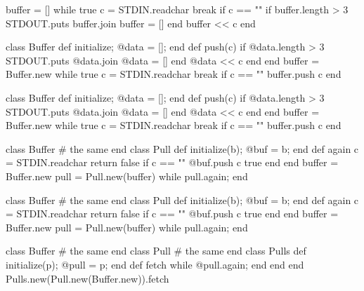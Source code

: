 \documentclass{article}
\begin{document}
\begin{pptWide}{2}
{\scriptsize\begin{ffcode}
buffer = []
while true
  c = STDIN.readchar
  break if c == "\n"
  if buffer.length > 3
    STDOUT.puts buffer.join
    buffer = []
  end
  buffer << c
end
\end{ffcode}
}
\par\columnbreak\par
{\scriptsize\begin{ffcode}
class Buffer
  def initialize; @data = []; end
  def push(c)
    if @data.length > 3
      STDOUT.puts @data.join
      @data = []
    end
    @data << c
  end
end
buffer = Buffer.new
while true
  c = STDIN.readchar
  break if c == "\n"
  buffer.push c
end
\end{ffcode}
}
\end{pptWide}
\plush{}

\begin{pptWide}{2}
{\scriptsize\begin{ffcode}
class Buffer
  def initialize; @data = []; end
  def push(c)
    if @data.length > 3
      STDOUT.puts @data.join
      @data = []
    end
    @data << c
  end
end
buffer = Buffer.new
while true
  c = STDIN.readchar
  break if c == "\n"
  buffer.push c
end
\end{ffcode}
}
\par\columnbreak\par
{\scriptsize\begin{ffcode}
class Buffer
  # the same
end
class Pull
  def initialize(b); @buf = b; end
  def again
    c = STDIN.readchar
    return false if c == "\n"
    @buf.push c
    true
  end
end
buffer = Buffer.new
pull = Pull.new(buffer)
while pull.again; end
\end{ffcode}
}
\end{pptWide}
\plush{}

\begin{pptWide}{2}
{\scriptsize\begin{ffcode}
class Buffer
  # the same
end
class Pull
  def initialize(b); @buf = b; end
  def again
    c = STDIN.readchar
    return false if c == "\n"
    @buf.push c
    true
  end
end
buffer = Buffer.new
pull = Pull.new(buffer)
while pull.again; end
\end{ffcode}
}
\par\columnbreak\par
{\scriptsize\begin{ffcode}
class Buffer
  # the same
end
class Pull
  # the same
end
class Pulls
  def initialize(p); @pull = p; end
  def fetch
    while @pull.again; end
  end
end
Pulls.new(Pull.new(Buffer.new)).fetch
\end{ffcode}
}
\end{pptWide}
\plush{}
\end{document}
